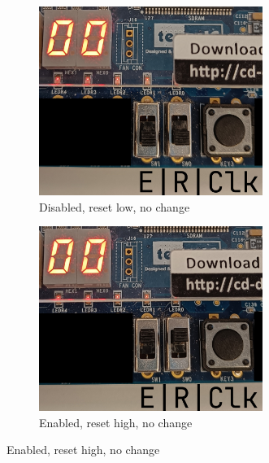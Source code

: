 \documentclass{article}
\begin{document}
\clearpage
\begin{figure}[h]
    \centering
    \begin{subfigure}[t]{0.45\textwidth}
        \centering
        \includegraphics[width=0.8\textwidth]{Figures/Part1_1.jpg}
        \caption{Disabled, reset low, no change}
        \label{fig:p1_1}
    \end{subfigure}
    \hfill
    \begin{subfigure}[t]{0.45\textwidth}
        \centering
        \includegraphics[width=0.8\textwidth]{Figures/Part1_2.jpg}
        \caption{Enabled, reset high, no change}
        \label{fig:p1_2}
    \end{subfigure}


\end{figure}
\end{document}
